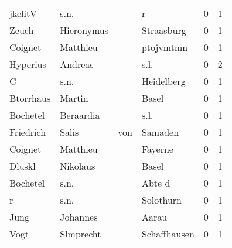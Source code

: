 \begin{center}
\begin{tiny}
\begin{longtabu}{llllrr}
                  jkelitV &                               s.n. &             &                                           r &          0 &         1 \\
                    Zeuch &                         Hieronymus &             &                                  Straasburg &          0 &         1 \\
                  Coignet &                           Matthieu &             &                                   ptojvmtmn &          0 &         1 \\
                 Hyperius &                            Andreas &             &                                        s.l. &          0 &         2 \\
                        C &                               s.n. &             &                                  Heidelberg &          0 &         1 \\
                Btorrhaus &                             Martin &             &                                       Basel &          0 &         1 \\
                 Bochetel &                          Beraardia &             &                                        s.l. &          0 &         1 \\
                Friedrich &                              Salis &         von &                                     Samaden &          0 &         1 \\
                  Coignet &                           Matthieu &             &                                     Fayerne &          0 &         1 \\
                   Dluskl &                           Nikolaus &             &                                       Basel &          0 &         1 \\
                 Bochetel &                               s.n. &             &                                      Abte d &          0 &         1 \\
                        r &                               s.n. &             &                                   Solothurn &          0 &         1 \\
                     Jung &                           Johannes &             &                                       Aarau &          0 &         1 \\
                     Vogt &                          Slmprecht &             &                                Schaffhausen &          0 &         1 \\

\end{longtabu}
\end{tiny}
\end{center}
